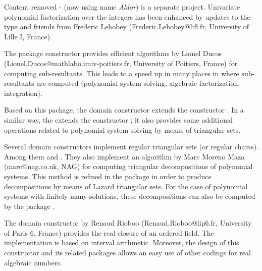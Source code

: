 Content removed - \aldor{} (now using name {\it Aldor}) is a separate
project.
%
Univariate polynomial factorization over the integers has been
enhanced by updates to the  type
and friends from Frederic Lehobey (Frederic.Lehobey@lifl.fr, University of
Lille I, France).

The package constructor 
provides efficient algorithms by Lionel Ducos
(Lionel.Ducos@mathlabo.univ-poitiers.fr, University of Poitiers, France)
for computing sub-resultants.
This leads to a speed up in many places in \Language{} where
sub-resultants are computed (polynomial system solving,
algebraic factorization, integration).

Based on this package, the domain constructor
extends the constructor .
In a similar way, the  extends
the constructor ;
it also provides some additional operations related
to polynomial system solving by means of triangular sets.

Several domain constructors implement
regular triangular sets (or regular chains).
Among them 
and .
They also implement an algorithm by Marc Moreno Maza (marc@nag.co.uk, NAG)
for computing triangular decompositions of polynomial systems.
This method is refined in the package 
in order to produce decompositions by means of Lazard triangular sets.
For the case of polynomial systems with finitely many solutions,
these decompositions can also be computed by
the package .

The domain constructor  by Renaud Rioboo
(Renaud.Rioboo@lip6.fr, University of Paris 6, France)
provides the real closure of an ordered field.
The implementation is based on interval arithmetic.
Moreover, the design of this constructor and its related
packages allows an easy use of other codings for real algebraic numbers.

